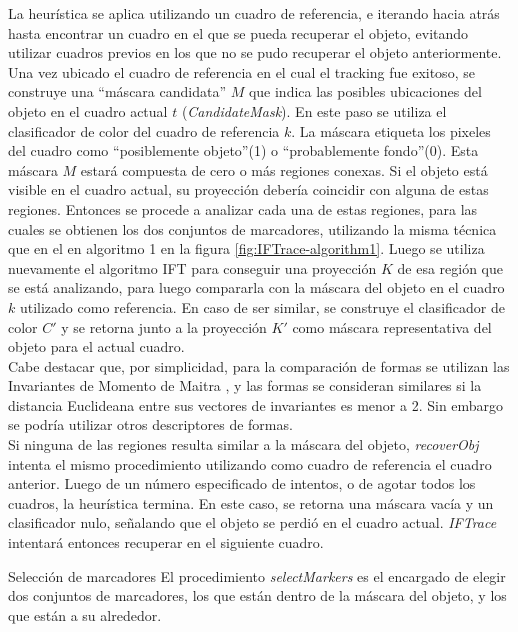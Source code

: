 \documentclass[a4paper,10pt]{article}
\begin{document}
La heurística se aplica utilizando un cuadro de referencia, e iterando hacia atrás
hasta encontrar un cuadro en el que se pueda recuperar el objeto, evitando 
utilizar cuadros previos en los que no se pudo recuperar el objeto anteriormente.
Una vez ubicado el cuadro de referencia en el cual el tracking fue exitoso, 
se construye una ``máscara candidata'' $M$ que indica las posibles ubicaciones
del objeto en el cuadro actual $t$ (\textit{CandidateMask}). En este paso se 
utiliza el clasificador de color del cuadro de referencia $k$. La máscara 
etiqueta los pixeles del cuadro como ``posiblemente objeto''(1) o 
``probablemente fondo''(0). Esta máscara $M$ estará compuesta de cero
o más regiones conexas. Si el objeto está visible en el cuadro actual, 
su proyección debería coincidir con alguna de estas regiones. Entonces 
se procede a analizar cada una de estas regiones, para las cuales se obtienen
los dos conjuntos de marcadores, utilizando la misma técnica que en el
en algoritmo 1 en la figura \ref{fig:IFTrace-algorithm1}. Luego se utiliza 
nuevamente el algoritmo IFT para conseguir una proyección $K$ de esa región que 
se está analizando, para luego compararla con la máscara del objeto en el cuadro
$k$ utilizado como referencia. En caso de ser similar, se construye el clasificador
de color $C'$ y se retorna junto a la proyección $K'$ como máscara representativa 
del objeto para el actual cuadro. \\
Cabe destacar que, por simplicidad, para la comparación de formas se utilizan
las Invariantes de Momento de Maitra \cite{MaitraMomentInvariants}, y las formas se consideran similares
si la distancia Euclideana entre sus vectores de invariantes es menor a 2. 
Sin embargo se podría utilizar otros descriptores de formas.\\
Si ninguna de las regiones resulta similar a la máscara del objeto, 
\textit{recoverObj} intenta el mismo procedimiento utilizando como cuadro de 
referencia el cuadro anterior. Luego de un número especificado de intentos, o
de agotar todos los cuadros, la heurística termina. En este caso, se retorna
una máscara vacía y un clasificador nulo, señalando que el objeto se perdió en
el cuadro actual. \textit{IFTrace} intentará entonces recuperar en el siguiente 
cuadro.

Selección de marcadores
El procedimiento \textit{selectMarkers} es el encargado de elegir dos conjuntos 
de marcadores, los que están dentro de la máscara del objeto, y los que están a
su alrededor.\\
\end{document}
